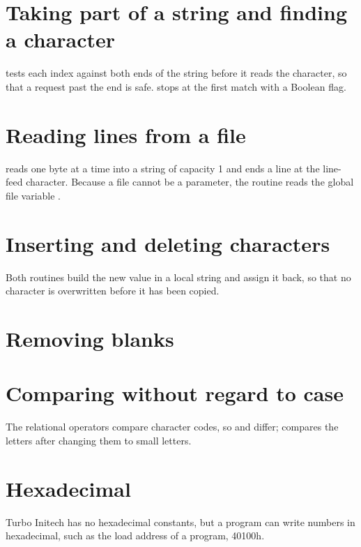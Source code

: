 \section{Taking part of a string and finding a character}

 tests each index against both ends of the string before it reads
the character, so that a request past the end is safe.   stops at
the first match with a Boolean flag.

\section{Reading lines from a file}

 reads one byte at a time into a string of capacity 1 and ends
a line at the line-feed character.  Because a file cannot be a parameter,
the routine reads the global file variable .

\section{Inserting and deleting characters}

Both routines build the new value in a local string and assign it back, so
that no character is overwritten before it has been copied.

\section{Removing blanks}

\section{Comparing without regard to case}

The relational operators compare character codes, so  and
 differ;  compares the letters after changing
them to small letters.

\section{Hexadecimal}

Turbo Initech has no hexadecimal constants, but a program can write numbers
in hexadecimal, such as the load address of a program, 40100h.
